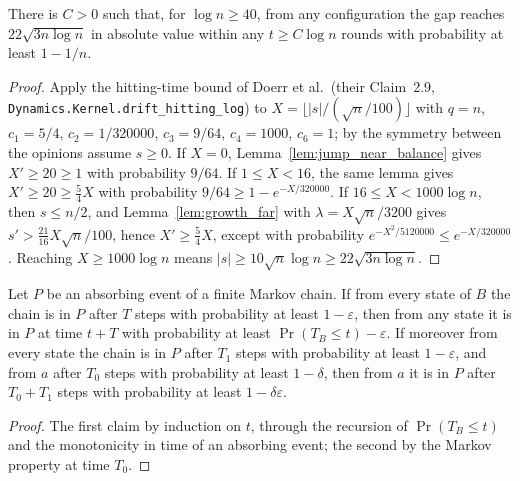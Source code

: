 \begin{theorem}\label{thm:symmetry_breaking}
  \leanok
  There is $C > 0$ such that, for $\log n \ge 40$, from any configuration the gap reaches
  $22\sqrt{3n\log n}$ in absolute value within any $t \ge C\log n$ rounds with probability at
  least $1 - 1/n$.
\end{theorem}
\begin{proof}
  \leanok
  Apply the hitting-time bound of Doerr et al.\ (their Claim~2.9,
  \texttt{Dynamics.Kernel.drift\_hitting\_log}) to $X = \lfloor |s|/(\sqrt n/100)\rfloor$ with
  $q = n$, $c_1 = 5/4$, $c_2 = 1/320000$, $c_3 = 9/64$, $c_4 = 1000$, $c_6 = 1$; by the
  symmetry between the opinions assume $s \ge 0$. If $X = 0$, Lemma~\ref{lem:jump_near_balance}
  gives $X' \ge 20 \ge 1$ with probability $9/64$. If $1 \le X < 16$, the same lemma gives
  $X' \ge 20 \ge \frac54 X$ with probability $9/64 \ge 1 - e^{-X/320000}$. If
  $16 \le X < 1000\log n$, then $s \le n/2$, and Lemma~\ref{lem:growth_far} with
  $\lambda = X\sqrt n/3200$ gives $s' > \frac{21}{16}X\sqrt n/100$, hence $X' \ge \frac54 X$,
  except with probability $e^{-X^2/5120000} \le e^{-X/320000}$. Reaching $X \ge 1000\log n$
  means $|s| \ge 10\sqrt n\log n \ge 22\sqrt{3n\log n}$.
\end{proof}

\begin{lemma}\label{lem:hit_absorb}
  \leanok
  Let $P$ be an absorbing event of a finite Markov chain. If from every state of $B$ the chain is
  in $P$ after $T$ steps with probability at least $1 - \varepsilon$, then from any state it is in
  $P$ at time $t + T$ with probability at least $\Pr(T_B \le t) - \varepsilon$. If moreover from
  every state the chain is in $P$ after $T_1$ steps with probability at least $1 - \varepsilon$,
  and from $a$ after $T_0$ steps with probability at least $1 - \delta$, then from $a$ it is in
  $P$ after $T_0 + T_1$ steps with probability at least $1 - \delta\varepsilon$.
\end{lemma}
\begin{proof}
  \leanok
  The first claim by induction on $t$, through the recursion of $\Pr(T_B \le t)$ and the
  monotonicity in time of an absorbing event; the second by the Markov property at time $T_0$.
\end{proof}

